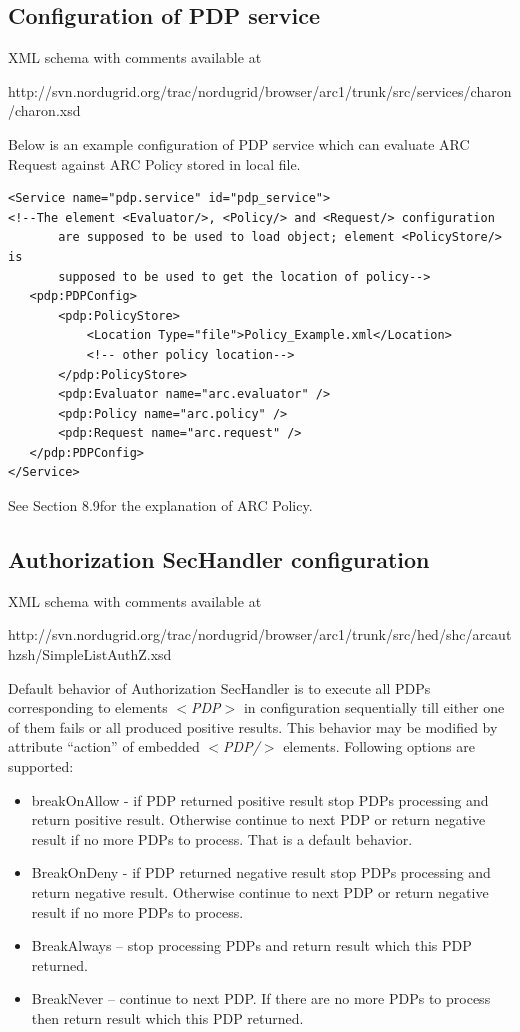 \documentclass{article}                            %
\begin{document}
\subsection{Configuration of PDP service} %
\label{subsec:pdpservice_conf}
XML schema with comments available at 

http://svn.nordugrid.org/trac/nordugrid/browser/arc1/trunk/src/services/charon/charon.xsd

Below is an example configuration of PDP service which can evaluate ARC Request against ARC Policy stored in local file.

\begin{verbatim}
<Service name="pdp.service" id="pdp_service">
<!--The element <Evaluator/>, <Policy/> and <Request/> configuration
       are supposed to be used to load object; element <PolicyStore/> is
       supposed to be used to get the location of policy-->
   <pdp:PDPConfig>
       <pdp:PolicyStore>
           <Location Type="file">Policy_Example.xml</Location>
           <!-- other policy location-->
       </pdp:PolicyStore>
       <pdp:Evaluator name="arc.evaluator" />
       <pdp:Policy name="arc.policy" />
       <pdp:Request name="arc.request" />
   </pdp:PDPConfig>
</Service>
\end{verbatim}

See Section 8.9for the explanation of ARC Policy.


\subsection{Authorization SecHandler configuration} %
\label{subsec:authzhandler_conf}
XML schema with comments available at 

http://svn.nordugrid.org/trac/nordugrid/browser/arc1/trunk/src/hed/shc/arcauthzsh/SimpleListAuthZ.xsd

Default behavior of Authorization SecHandler is to execute all PDPs corresponding to elements \textit{$<$PDP$>$} in configuration sequentially till either one of them fails or all produced positive results. This behavior may be modified by attribute ``action'' of embedded \textit{$<$PDP/$>$} elements. Following options are supported:

    \begin{itemize}
        \item breakOnAllow - if PDP returned positive result stop PDPs processing and return positive result. Otherwise continue to next PDP or return negative result if no more PDPs to process. That is a default behavior.
        \item BreakOnDeny - if PDP returned negative result stop PDPs processing and return negative result. Otherwise continue to next PDP or return negative result if no more PDPs to process.
        \item BreakAlways – stop processing PDPs and return result which this PDP returned.
        \item BreakNever – continue to next PDP. If there are no more PDPs to process then return result which this PDP returned.
    \end{itemize}
\end{document}

